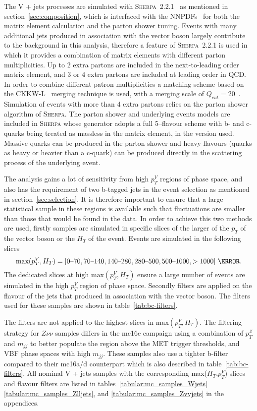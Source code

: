 The V + jets processes are simulated with
\textsc{Sherpa}~2.2.1~\cite{1126-6708-2009-02-007} as mentioned in
section~\ref{sec:composition}, which is interfaced with the
NNPDFs~\cite{Ball:2012cx} for both the matrix element calculation and the parton shower
tuning. Events with many additional jets produced in association with the vector
boson largely contribute to the background in this analysis, therefore a feature
of \textsc{Sherpa}~2.2.1 is used in which it provides a combination of matrix
elements with different parton multiplicities. Up to 2 extra partons are
included in the next-to-leading order matrix element, and 3 or 4 extra partons
are included at leading order in QCD. In order to combine different patron
multiplicities a matching scheme based on the CKKW-L~\cite{Lonnblad:2001iq,
  Lavesson:2005xu} merging technique is used, with a merging scale of $Q_{cut} =
20$~\GeV. Simulation of events with more than 4 extra partons relies on the
parton shower algorithm of \textsc{Sherpa}. The parton shower and underlying
events models are included in \textsc{Sherpa} whose generator adopts a full
5--flavour scheme with b- and c-quarks being treated as massless in the matrix
element, in the version used. Massive quarks can be produced in the parton
shower and heavy flavours (quarks as heavy or heavier than a c-quark) can be
produced directly in the scattering process of the underlying event.

The analysis gains a lot of sensitivity from high $p_T^V$ regions of phase
space, and also has the requirement of two b-tagged jets in the event selection
as mentioned in section~\ref{sec:selection}. It is therefore important to ensure
that a large statistical sample in these regions is available such that
fluctuations are smaller than those that would be found in the data. In order to
achieve this two methods are used, firstly samples are simulated in specific
slices of the larger of the $p_T$ of the vector boson or the $H_T$ of the event.
Events are simulated in the following slices
\begin{equation}
  \text{max}(p_T^V, H_T) = [0\text{--}70, 70\text{--}140, 140\text{--}280, 280\text{--}500, 500\text{--}1000, >1000]~\GeV.
\end{equation}
The dedicated slices at high $\text{max}(p_T^V, H_T)$ ensure a large number of
events are simulated in the high $p_T^V$ region of phase space. Secondly filters
are applied on the flavour of the jets that produced in association with the
vector boson.  The filters used for these samples are shown in
table~\ref{tab:bc-filters}.

The filters are not applied to the highest slices in $\text{max}(p_T^V, H_T)$.
The filtering strategy for $Z\nu\nu$ samples differs in the mc16e campaign using
a combination of $p_T^Z$ and $m_{jj}$ to better populate the region above the
MET trigger thresholds, and VBF phase spaces with high $m_{jj}$. These samples
also use a tighter b-filter compared to their mc16a/d counterpart which is also
described in table~\ref{tab:bc-filters}. All nominal V + jets samples with the
corresponding max($H_T$,$p_T^V$) slices and flavour filters are listed in
tables~\ref{tabular:mc_samples_Wjets} \ref{tabular:mc_samples_Zlljets}, and
\ref{tabular:mc_samples_Zvvjets} in the appendices.

